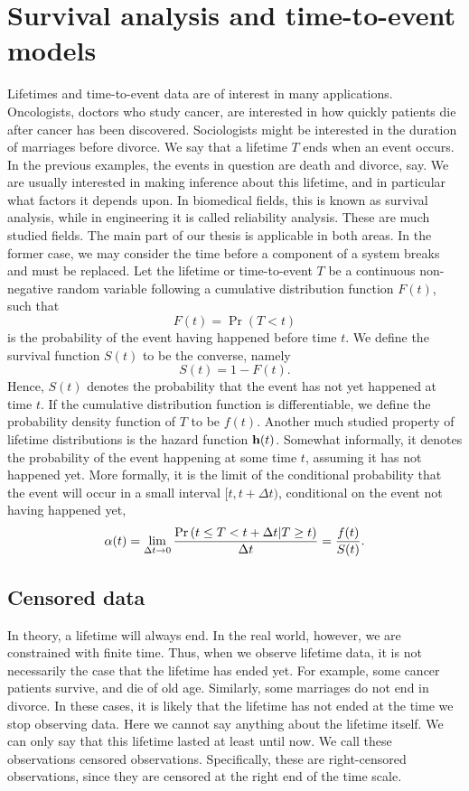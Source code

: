 \section{Survival analysis and time-to-event models}\label{sec:survival}
Lifetimes and time-to-event data are of interest in many applications. Oncologists, doctors who study cancer, are interested in how quickly patients die after cancer has been discovered. Sociologists might be interested in the duration of marriages before divorce. We say that a lifetime $T$ ends when an event occurs. In the previous examples, the events in question are death and divorce, say. We are usually interested in making inference about this lifetime, and in particular what factors it depends upon. In biomedical fields, this is known as survival analysis, while in engineering it is called reliability analysis. These are much studied fields. The main part of our thesis is applicable in both areas. In the former case, we may consider the time before a component of a system breaks and must be replaced. Let the lifetime or time-to-event $T$ be a continuous non-negative random variable following a cumulative distribution function $F(t)$, such that
\begin{equation*}%
    F(t)=\Pr(T<t)
\end{equation*}
is the probability of the event having happened before time $t$. We define the survival function $S(t)$ to be the converse, namely
\begin{equation*}%
    S(t)=1-F(t).
\end{equation*}
Hence, $S(t)$ denotes the probability that the event has not yet happened at time $t$. If the cumulative distribution function is differentiable, we define the probability density function of $T$ to be $f(t)$. Another much studied property of lifetime distributions is the hazard function $\mathbf{h}(t)$. Somewhat informally, it denotes the probability of the event happening at some time $t$, assuming it has not happened yet. More formally, it is the limit of the conditional probability that the event will occur in a small interval $[t,t+\Delta t)$, conditional on the event not having happened yet,
\begin{equation*}%
    \hz(t)=\lim_{\Delta t\to 0}\frac{\Pr{(t\leq T<t+\Delta t|T\geq t)}}{\Delta t}=\frac{f(t)}{S(t)}.
\end{equation*}
\subsection{Censored data}
In theory, a lifetime will always end. In the real world, however, we are constrained with finite time. Thus, when we observe lifetime data, it is not necessarily the case that the lifetime has ended yet. For example, some cancer patients survive, and die of old age. Similarly, some marriages do not end in divorce. In these cases, it is likely that the lifetime has not ended at the time we stop observing data. Here we cannot say anything about the lifetime itself. We can only say that this lifetime lasted at least until now. We call these observations censored observations. Specifically, these are right-censored observations, since they are censored at the right end of the time scale.
